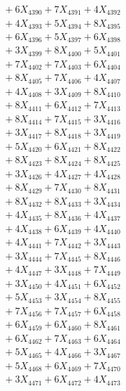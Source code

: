 \documentclass[a4paper,10pt]{article}
\begin{document}
{\begin{align}
&\;  + 6 X_{4390} + 7 X_{4391} + 4 X_{4392} \\[0.3ex]
&\;  + 4 X_{4393} + 5 X_{4394} + 8 X_{4395} \\[0.3ex]
&\;  + 6 X_{4396} + 5 X_{4397} + 6 X_{4398} \\[0.3ex]
&\;  + 3 X_{4399} + 8 X_{4400} + 5 X_{4401} \\[0.3ex]
&\;  + 7 X_{4402} + 7 X_{4403} + 6 X_{4404} \\[0.3ex]
&\;  + 8 X_{4405} + 7 X_{4406} + 4 X_{4407} \\[0.3ex]
&\;  + 4 X_{4408} + 3 X_{4409} + 8 X_{4410} \\[0.3ex]
&\;  + 8 X_{4411} + 6 X_{4412} + 7 X_{4413} \\[0.3ex]
&\;  + 8 X_{4414} + 7 X_{4415} + 3 X_{4416} \\[0.3ex]
&\;  + 3 X_{4417} + 8 X_{4418} + 3 X_{4419} \\[0.5ex]\allowbreak
&\;  + 5 X_{4420} + 6 X_{4421} + 8 X_{4422} \\[0.3ex]
&\;  + 8 X_{4423} + 8 X_{4424} + 8 X_{4425} \\[0.3ex]
&\;  + 3 X_{4426} + 4 X_{4427} + 4 X_{4428} \\[0.3ex]
&\;  + 8 X_{4429} + 7 X_{4430} + 8 X_{4431} \\[0.3ex]
&\;  + 8 X_{4432} + 8 X_{4433} + 3 X_{4434} \\[0.3ex]
&\;  + 4 X_{4435} + 8 X_{4436} + 4 X_{4437} \\[0.3ex]
&\;  + 4 X_{4438} + 6 X_{4439} + 4 X_{4440} \\[0.3ex]
&\;  + 4 X_{4441} + 7 X_{4442} + 3 X_{4443} \\[0.3ex]
&\;  + 3 X_{4444} + 7 X_{4445} + 8 X_{4446} \\[0.3ex]
&\;  + 4 X_{4447} + 3 X_{4448} + 7 X_{4449} \\[0.5ex]\allowbreak
&\;  + 3 X_{4450} + 4 X_{4451} + 6 X_{4452} \\[0.3ex]
&\;  + 5 X_{4453} + 3 X_{4454} + 8 X_{4455} \\[0.3ex]
&\;  + 7 X_{4456} + 7 X_{4457} + 6 X_{4458} \\[0.3ex]
&\;  + 6 X_{4459} + 6 X_{4460} + 8 X_{4461} \\[0.3ex]
&\;  + 6 X_{4462} + 7 X_{4463} + 6 X_{4464} \\[0.3ex]
&\;  + 5 X_{4465} + 4 X_{4466} + 3 X_{4467} \\[0.3ex]
&\;  + 5 X_{4468} + 6 X_{4469} + 7 X_{4470} \\[0.3ex]
&\;  + 3 X_{4471} + 6 X_{4472} + 4 X_{4473} \\[0.3ex]

\end{align}}
\end{document}
